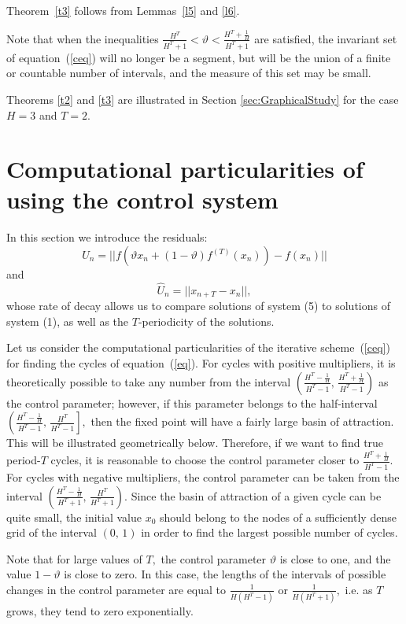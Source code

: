 \documentclass[12pt,a4paper]{amsart}
\begin{document}
 Theorem~\ref{t3} follows from  Lemmas~\ref{l5} and \ref{l6}.

Note that when the inequalities $\displaystyle{ \frac{H^T}{H^T+1}<\vartheta<\frac{H^T+\frac{1}{H}}{H^T+1}}$ are satisfied,
the invariant set of equation~(\ref{ceq}) will no longer be a segment, but will be the union of a finite or countable 
number of intervals, and the measure of this set may be small.

Theorems \ref{t2} and \ref{t3} are illustrated in Section \ref{sec:GraphicalStudy} for the case $H = 3$ and $T = 2$.
\section{Computational particularities of using the control system} \label{sec:ComputationalParticularities}

 In this section we introduce the residuals: 
 $$U_n = ||f(\vartheta x_n + (1 - \vartheta) f^{(T)}(x_n)) - f(x_n)||$$ and $$\hat{U}_n = || x_{n+T} - x_n||,$$ whose rate of decay allows us to compare solutions of system (5) to solutions of system (1), as well as the $T$-periodicity of the solutions. 

Let us consider the computational particularities of the iterative scheme~(\ref{ceq}) for finding the cycles of equation~(\ref{eq}).
For cycles with positive multipliers, it is theoretically possible to take any number from the interval 
$\left(\frac{H^T - \frac{1}{H}}{H^T-1},\,\frac{H^T + \frac{1}{H}}{H^T-1}\right)$ as the control parameter;
however, if this parameter belongs to the half-interval $\left(\frac{H^T - \frac{1}{H}}{H^T-1},\,\frac{H^T}{H^T-1}\right],$
then the fixed point will have a fairly large basin of attraction. This will be illustrated geometrically below. 
Therefore, if we want to find true period-$T$ cycles, it is reasonable to choose the control parameter closer to $\displaystyle{\frac{H^T + \frac{1}{H}}{H^T-1}}.$ For cycles with negative 
multipliers, the control parameter can be taken from the interval 
$\displaystyle{\left(\frac{H^T - \frac{1}{H}}{H^T + 1},\,\frac{H^T}{H^T + 1}\right)}.$ Since the basin of attraction of a given cycle can be quite small, the initial value $x_0$ should belong to the nodes of a sufficiently dense grid of the interval $(0,\,1)$ in order to find the largest possible 
number of cycles.

Note that for large values of $T,$ the control parameter $\vartheta$ is close to one, and the value $1-\vartheta$ is close to zero. 
In this case, the lengths of the intervals of possible changes in the control parameter are equal to $\frac{1}{H(H^T-1)}$ or
$\frac{1}{H(H^T+1)},$ i.e. as $T$ grows, they tend to zero exponentially. 
\end{document}
